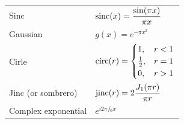\begin{center}
\begin{tabular}{ll}
\\[0.7cm]

Sinc &
$\displaystyle
\operatorname{sinc}(x)=
\frac{\sin(\pi x)}{\pi x}
$

\\[0.5cm]

Gaussian &
$\displaystyle
g(x)=e^{-\pi x^2}
$

\\[0.5cm]

Cirle &
$\displaystyle
\operatorname{circ}(r)=
\begin{cases}
1,&r<1\\
\frac12,&r=1\\
0,&r>1
\end{cases}
$

\\[0.7cm]

Jinc (or sombrero) &
$\displaystyle
\operatorname{jinc}(r)=
2\frac{J_1(\pi r)}{\pi r}
$

\\[0.5cm]

Complex exponential &
$\displaystyle
e^{i2\pi f_0x}
$

\\
\bottomrule
\end{tabular}
\end{center}